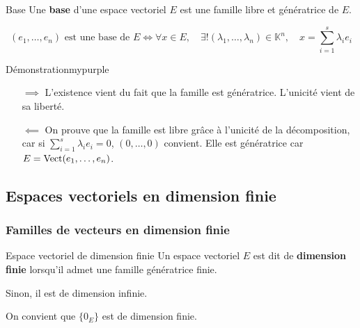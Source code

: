     \begin{defitheo}{Base}{}
        Une \textbf{base} d’une espace vectoriel $E$ est une famille libre et génératrice de $E$.

        \[ (e_1,\ldots,e_n) \text{ est une base de } E \iff \forall x \in E, 
        \quad \exists ! (\lambda_1,\ldots,\lambda_n) \in \mathbb{K}^n, \quad x = \sum\limits_{i=1}^s \lambda_i e_i \]
    \end{defitheo}

    \begin{demo}{Démonstration}{mypurple}
        \begin{itemize}
            \item[$\implies$] L’existence vient du fait que la famille est génératrice. L’unicité vient de sa liberté.
            \item[$\impliedby$] On prouve que la famille est libre grâce à l’unicité de la décomposition, car si $\sum\limits_{i=1}^s \lambda_i e_i = 0$, $(0,\ldots,0)$ convient. Elle est génératrice car $E = \operatorname{Vect}(e_1,\ldots,e_n)$.
        \end{itemize}
    \end{demo}

\subsection{Espaces vectoriels en dimension finie}

    \subsubsection{Familles de vecteurs en dimension finie}

    \begin{defi}{Espace vectoriel de dimension finie}{}
        Un espace vectoriel $E$ est dit de \textbf{dimension finie} lorsqu’il admet une famille génératrice finie.

        Sinon, il est de dimension infinie. 

        On convient que $\big\{ 0_E \big\}$ est de dimension finie.
    \end{defi}

